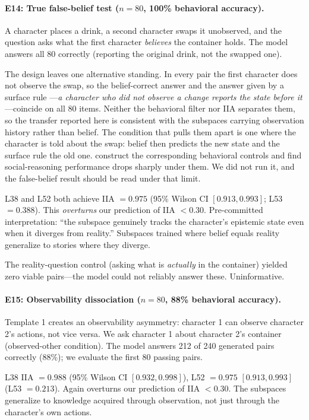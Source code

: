 \documentclass{article}
\begin{document}
\paragraph{E14: True false-belief test ($n = 80$, 100\% behavioral accuracy).}
A character places a drink, a second character swaps it unobserved, and the question asks what the first character \emph{believes} the container holds. The model answers all 80 correctly (reporting the original drink, not the swapped one).

The design leaves one alternative standing. In every pair the first character does not
observe the swap, so the belief-correct answer and the answer given by a surface rule
---\emph{a character who did not observe a change reports the state before it}---coincide on
all 80 items. Neither the behavioral filter nor IIA separates them, so the transfer reported
here is consistent with the subspaces carrying observation history rather than belief. The
condition that pulls them apart is one where the character is told about the swap:
belief then predicts the new state and the surface rule the old one. \citet{shapira2024clever}
construct the corresponding behavioral controls and find social-reasoning performance drops
sharply under them. We did not run it, and the false-belief result should be read under that
limit.

L38 and L52 both achieve IIA $= 0.975$ (95\% Wilson CI $[0.913, 0.993]$; L53 $= 0.388$). This \emph{overturns} our prediction of IIA $< 0.30$. Pre-committed interpretation: ``the subspace genuinely tracks the character's epistemic state even when it diverges from reality.'' Subspaces trained where belief equals reality generalize to stories where they diverge.

The reality-question control (asking what is \emph{actually} in the container) yielded zero viable pairs---the model could not reliably answer these. Uninformative.

\paragraph{E15: Observability dissociation ($n = 80$, 88\% behavioral accuracy).}
Template 1 creates an observability asymmetry: character 1 can observe character 2's actions, not vice versa. We ask character 1 about character 2's container (observed-other condition). The model answers 212 of 240 generated pairs correctly (88\%); we evaluate the first 80 passing pairs.

L38 IIA $= 0.988$ (95\% Wilson CI $[0.932, 0.998]$), L52 $= 0.975$ $[0.913, 0.993]$ (L53 $= 0.213$). Again overturns our prediction of IIA $< 0.30$. The subspaces generalize to knowledge acquired through observation, not just through the character's own actions.
\end{document}
